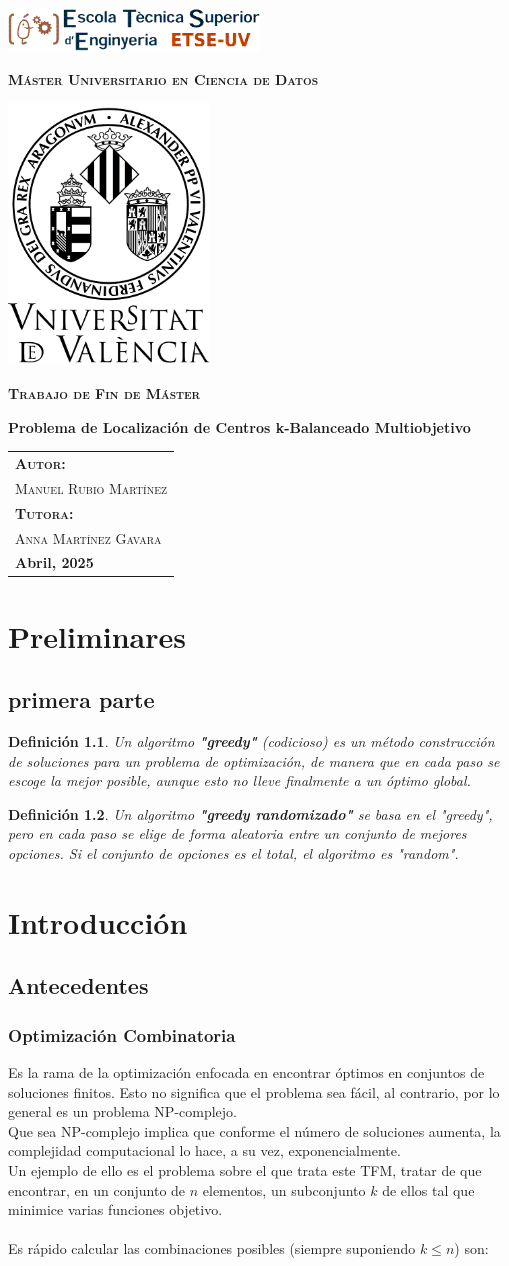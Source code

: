 \documentclass[12pt,a4paper]{book}
\newtheorem{defi}{Definición}[section]
\newcommand{\nuevaportada}[6]{
    \thispagestyle{empty}
    \begin{center}
        \includegraphics[width=0.5\textwidth]{images/logo.png}
        
        \vspace{0.5cm}
        {\Large\bfseries\textsc{M\'aster Universitario en #1}\par}
        
        \vspace{0.5cm}
        \includegraphics[width=0.4\textwidth]{images/uv.png}
        
        \vspace{0.5cm}
        {\Large\bfseries\textsc{Trabajo de Fin de M\'aster}\par}
        
        \vspace{0.5cm}
        {\Large\bfseries #2\par}
        
        \vspace{2cm}
        \begin{flushright}
            \begin{tabular}{l} 
                {\large\bfseries\textsc{Autor:}} \\
                {\large\textsc{#3}} \\ [0.5cm] 
                {\large\bfseries\textsc{Tutora:}} \\ 
                {\large\textsc{#4}} \\ [0.5cm]
                {\large\bfseries #5} 
            \end{tabular}
        \end{flushright}
    \end{center}
    \clearpage
}
\begin{document}
\nuevaportada{Ciencia de Datos}{Problema de Localización de Centros k-Balanceado Multiobjetivo}{Manuel Rubio Martínez}{Anna Martínez Gavara}{Abril, 2025}

\clearpage

\newpage
\tableofcontents

\chapter{Preliminares}
\section{primera parte}

\begin{defi}
Un algoritmo \textbf{"greedy"} (codicioso) es un método construcción de soluciones para un problema de optimización,
de manera que en cada paso se escoge la mejor posible, aunque esto no lleve finalmente a un óptimo global.
\end{defi}

\bigskip

\begin{defi}
Un algoritmo \textbf{"greedy randomizado"} se basa en el "greedy", pero en cada paso se elige de forma aleatoria entre un conjunto de mejores opciones.
Si el conjunto de opciones es el total, el algoritmo es "random".
\end{defi}

\chapter{Introducción}

\section{Antecedentes}
\subsection{Optimización Combinatoria}

Es la rama de la optimización enfocada en encontrar óptimos en conjuntos de soluciones finitos.
Esto no significa que el problema sea fácil, al contrario, por lo general es un problema NP-complejo. \\
Que sea NP-complejo implica que conforme el número de soluciones aumenta, la complejidad computacional lo hace, a su vez, exponencialmente. \\
Un ejemplo de ello es el problema sobre el que trata este TFM, 
tratar de que encontrar, en un conjunto de $n$ elementos, un subconjunto $k$ de ellos tal que  minimice varias funciones objetivo.
\\ \\
Es rápido calcular las combinaciones posibles (siempre suponiendo $k \leq  n$) son:
\end{document}
